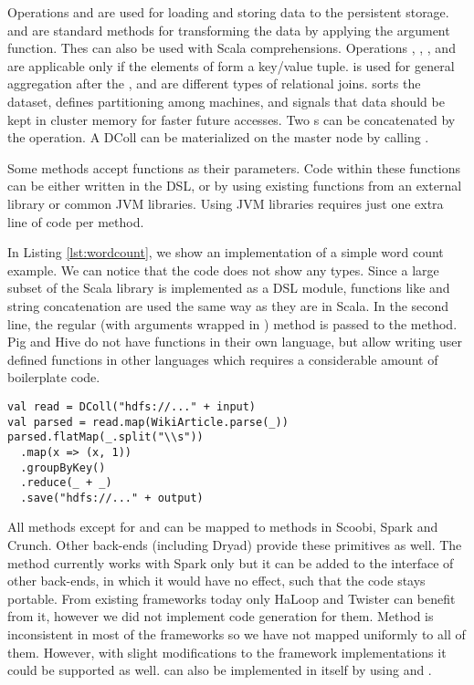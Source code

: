 Operations  and  are used for loading and storing data
to the persistent storage.  and  are standard
methods for transforming the data by applying the argument function. Thes can
also be used with Scala  comprehensions. Operations
, , ,  and 
are applicable only if the elements of  form a key/value tuple.
 is used for general aggregation after the ,
 and  are different types of relational joins.
 sorts the dataset,  defines partitioning among
machines, and  signals that data should be kept in cluster memory
for faster future accesses. Two s can be concatenated by the
\code{++} operation. A DColl can be materialized on the master node by calling
.

Some methods accept functions as their parameters. Code within these functions
can be either written in the \tool DSL, or by using existing functions from an
external library or common JVM libraries. Using JVM libraries requires just one
extra line of code per method.

In Listing \ref{lst:wordcount}, we show an implementation of a simple word count
example. We can notice that the code does not show any  types.
Since a large subset of the Scala library is implemented as a DSL module, functions like
 and string concatenation are used the same way as they are in
Scala. In the second line, the regular (with arguments wrapped in )
method  is passed to the  method. Pig and Hive do not have
functions in their own language, but allow writing user defined functions in
other languages which requires a considerable amount of boilerplate code.

\begin{lstlisting}[name=code, caption=An example of a simple word count
program., captionpos=b, label=lst:wordcount, float=t] 
val read = DColl("hdfs://..." + input) 
val parsed = read.map(WikiArticle.parse(_))
parsed.flatMap(_.split("\\s"))
  .map(x => (x, 1))
  .groupByKey()
  .reduce(_ + _)
  .save("hdfs://..." + output)
\end{lstlisting}

All methods except for  and  can be mapped to methods in
Scoobi, Spark and Crunch. Other back-ends (including Dryad) provide these
primitives as well. The  method currently works with Spark only but
it can be added to the interface of other back-ends, in which it would have no
effect, such that the code stays portable. From existing frameworks today only
HaLoop \cite{bu_haloop:_2010} and Twister \cite{ekanayake_twister:_2010} can
benefit from it, however we did not implement code generation for them. Method
 is inconsistent in most of the frameworks so we have not mapped
uniformly to all of them. However, with slight modifications to the framework
implementations it could be supported as well.  can also be
implemented in \tool itself by using  and .
